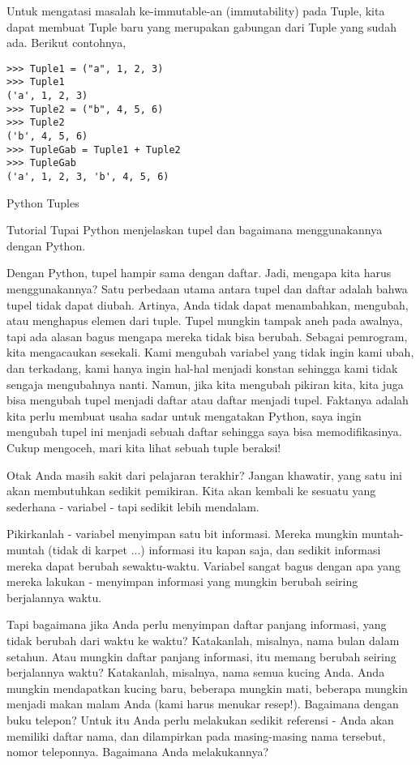 Untuk mengatasi masalah ke-immutable-an (immutability) pada Tuple, kita dapat membuat Tuple baru yang merupakan gabungan dari Tuple yang sudah ada. Berikut contohnya,
\begin{verbatim}
>>> Tuple1 = ("a", 1, 2, 3)
>>> Tuple1
('a', 1, 2, 3)
>>> Tuple2 = ("b", 4, 5, 6)
>>> Tuple2
('b', 4, 5, 6)
>>> TupleGab = Tuple1 + Tuple2
>>> TupleGab
('a', 1, 2, 3, 'b', 4, 5, 6)
\end{verbatim}
\vspace{12pt}
 \hspace*{0.5in} \vspace{12pt}
Python Tuples \par
Tutorial Tupai Python menjelaskan tupel dan bagaimana menggunakannya dengan Python. \par
Dengan Python, tupel hampir sama dengan daftar. Jadi, mengapa kita harus menggunakannya? Satu perbedaan utama antara tupel dan daftar adalah bahwa tupel tidak dapat diubah. Artinya, Anda tidak dapat menambahkan, mengubah, atau menghapus elemen dari tuple. Tupel mungkin tampak aneh pada awalnya, tapi ada alasan bagus mengapa mereka tidak bisa berubah. Sebagai pemrogram, kita mengacaukan sesekali. Kami mengubah variabel yang tidak ingin kami ubah, dan terkadang, kami hanya ingin hal-hal menjadi konstan sehingga kami tidak sengaja mengubahnya nanti. Namun, jika kita mengubah pikiran kita, kita juga bisa mengubah tupel menjadi daftar atau daftar menjadi tupel. Faktanya adalah kita perlu membuat usaha sadar untuk mengatakan Python, saya ingin mengubah tupel ini menjadi sebuah daftar sehingga saya bisa memodifikasinya. Cukup mengoceh, mari kita lihat sebuah tuple beraksi! \par
Otak Anda masih sakit dari pelajaran terakhir? Jangan khawatir, yang satu ini akan membutuhkan sedikit pemikiran. Kita akan kembali ke sesuatu yang sederhana - variabel - tapi sedikit lebih mendalam. \par
\vspace{12pt}
Pikirkanlah - variabel menyimpan satu bit informasi. Mereka mungkin muntah-muntah (tidak di karpet ...) informasi itu kapan saja, dan sedikit informasi mereka dapat berubah sewaktu-waktu. Variabel sangat bagus dengan apa yang mereka lakukan - menyimpan informasi yang mungkin berubah seiring berjalannya waktu. \par
\vspace{12pt}
Tapi bagaimana jika Anda perlu menyimpan daftar panjang informasi, yang tidak berubah dari waktu ke waktu? Katakanlah, misalnya, nama bulan dalam setahun. Atau mungkin daftar panjang informasi, itu memang berubah seiring berjalannya waktu? Katakanlah, misalnya, nama semua kucing Anda. Anda mungkin mendapatkan kucing baru, beberapa mungkin mati, beberapa mungkin menjadi makan malam Anda (kami harus menukar resep!). Bagaimana dengan buku telepon? Untuk itu Anda perlu melakukan sedikit referensi - Anda akan memiliki daftar nama, dan dilampirkan pada masing-masing nama tersebut, nomor teleponnya. Bagaimana Anda melakukannya? \par
